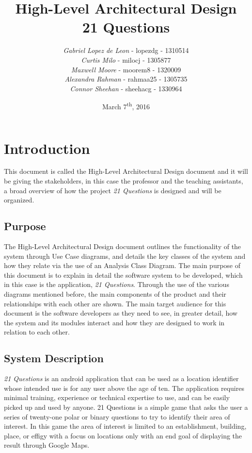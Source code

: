 \documentclass[titlepage]{article}
\title{\Huge{\textbf{High-Level Architectural Design\\21 Questions}}\vspace{9cm}}
\author{\textit{Gabriel Lopez de Leon} - lopezdg - 1310514\\\textit{Curtis Milo} - milocj - 1305877\\\textit{Maxwell Moore} - moorem8 - 1320009\\\textit{Alexandra Rahman} - rahmaa25 - 1305735\\\textit{Connor Sheehan} - sheehacg - 1330964}
\date{March 7\textsuperscript{th}, 2016}
\begin{document}
\maketitle	

\tableofcontents
\listoffigures
\listoftables
\newpage

\section{Introduction}
\label{sec:introduction}

This document is called the High-Level Architectural Design document and it will be giving the stakeholders, in this case the professor and the teaching assistants, a broad overview of how the project \textit{21 Questions} is designed and will be organized. 

\subsection{Purpose}
\label{sub:purpose}
The High-Level Architectural Design document outlines the functionality of the system through Use Case diagrams, and details the key classes of the system and how they relate via the use of an Analysis Class Diagram. The main purpose of this document is to explain in detail the software system to be developed, which in this case is the application, \textit{21 Questions}. Through the use of the various diagrams mentioned before, the main components of the product and their relationships with each other are shown. The main target audience for this document is the software developers as they need to see, in greater detail, how the system and its modules interact and how they are designed to work in relation to each other.

\subsection{System Description}
\label{sub:system_description}
\textit{21 Questions} is an android application that can be used as a location identifier whose intended use is for any user above the age of ten. The application requires minimal training, experience or technical expertise to use, and can be easily picked up and used by anyone. 21 Questions is a simple game that asks the user a series of twenty-one polar or binary questions to try to identify their area of interest. In this game the area of interest is limited to an establishment, building, place, or effigy with a focus on locations only with an end goal of displaying the result through Google Maps.
\end{document}
